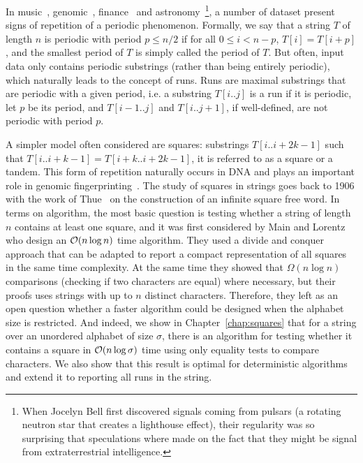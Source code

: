 In music~\cite{arom1989time}, genomic~\cite{pich2018somatic}, finance~\cite{harvey2007trends} and astronomy~\cite{hewish1979observation}\footnote{ When Jocelyn Bell first discovered signals coming from pulsars (a rotating neutron star that creates a lighthouse effect), their regularity was so surprising that speculations where made on the fact that they might be signal from extraterrestrial intelligence.}, a number of dataset present signs of repetition of a periodic phenomenon.
Formally, we say that a string $T$ of length $n$ is periodic with period $p \leq n/2$ if for all $0 \leq i < n - p$, $T[i]=T[i+p]$, and the smallest period of $T$ is simply called the period of $T$.
%
But often, input data only contains periodic substrings (rather than being entirely periodic), which naturally leads to the concept of runs. Runs are maximal substrings that are periodic with a given period, i.e. a substring $T[i..j]$ is a run if it is periodic, let $p$ be its period, and $T[i-1..j]$ and $T[i..j+1]$, if well-defined, are not periodic with period $p$. 

A simpler model often considered are squares: substrings $T[i..i+2k-1]$ such that $T[i..i+k-1]=T[i+k..i+2k-1]$, it is referred to as a square or a tandem. This form of repetition naturally occurs in DNA and plays an important role in genomic fingerprinting~\cite{Kolpakov2003,GYMREK20179}. 
%
The study of squares in strings goes back to 1906 with the work of Thue~\cite{thue1906} on the construction of an infinite square free word. In terms on algorithm, the most basic question is testing whether a string of length $n$ contains at least one square, and it was first considered by Main and Lorentz~\cite{Main1984} who design an $\mathcal{O}(n \log n)$ time algorithm. They used a divide and conquer approach that can be adapted to report a compact representation of all squares in the same time complexity. At the same time they showed that $\Omega(n\log n)$ comparisons (checking if two characters are equal) where necessary, but their proofs uses strings with up to $n$ distinct characters. Therefore, they left as an open question whether a faster algorithm could be designed when the alphabet size is restricted.  
And indeed, we show in Chapter~\ref{chap:squares} that for a string over an unordered alphabet of size $\sigma$, there is an algorithm for testing whether it contains a square in $\mathcal{O}(n\log \sigma)$ time using only equality tests to compare characters. We also show that this result is optimal for deterministic algorithms and extend it to reporting all runs in the string.

